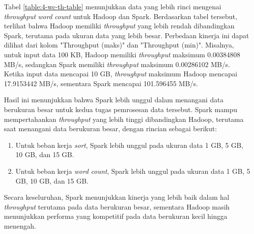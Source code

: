 Tabel \ref{table:4-wc-th-table} menunjukkan data yang lebih rinci mengenai \textit{throughput} \textit{word count} untuk Hadoop dan Spark. Berdasarkan tabel tersebut, terlihat bahwa Hadoop memiliki \textit{throughput} yang lebih rendah dibandingkan Spark, terutama pada ukuran data yang lebih besar.
Perbedaan kinerja ini dapat dilihat dari kolom "Throughput (maks)" dan "Throughput (min)". Misalnya, untuk input data 100 KB, Hadoop memiliki \textit{throughput} maksimum 0.00384808 MB/s, sedangkan Spark memiliki \textit{throughput} maksimum 0.00286102 MB/s. Ketika input data mencapai 10 GB, \textit{throughput} maksimum Hadoop mencapai 17.9153442 MB/s, sementara Spark mencapai 101.596455 MB/s.

Hasil ini menunjukkan bahwa Spark lebih unggul dalam menangani data berukuran besar untuk kedua tugas pemrosesan data tersebut. Spark mampu mempertahankan \textit{throughput} yang lebih tinggi dibandingkan Hadoop, terutama saat menangani data berukuran besar, dengan rincian sebagai berikut:
\begin{enumerate}
\item Untuk beban kerja \textit{sort}, Spark lebih unggul pada ukuran data 1 GB, 5 GB, 10 GB, dan 15 GB.
\item Untuk beban kerja \textit{word count}, Spark lebih unggul pada ukuran data 1 GB, 5 GB, 10 GB, dan 15 GB.
\end{enumerate}

Secara keseluruhan, Spark menunjukkan kinerja yang lebih baik dalam hal \textit{throughput} terutama pada data berukuran besar, sementara Hadoop masih menunjukkan performa yang kompetitif pada data berukuran kecil hingga menengah.


